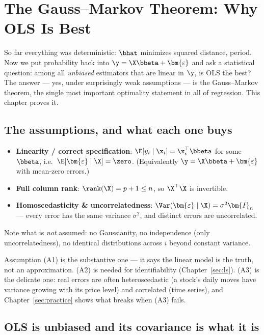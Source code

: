 \section{The Gauss--Markov Theorem: Why OLS Is Best}\label{sec:gauss-markov}

So far everything was deterministic: $\bhat$ minimizes squared distance, period. Now we put probability back into $\y = \X\bbeta + \bm{\varepsilon}$ and ask a statistical question: among all \emph{unbiased} estimators that are linear in $\y$, is OLS the best? The answer — yes, under surprisingly weak assumptions — is the Gauss--Markov theorem, the single most important optimality statement in all of regression. This chapter proves it.

\subsection{The assumptions, and what each one buys}

\begin{keybox}
\begin{itemize}
  \item[\textbf{(A1)}] \textbf{Linearity / correct specification}: $\E[y_i \mid \x_i] = \x_i^\top \bbeta$ for some $\bbeta$, i.e.\ $\E[\bm{\varepsilon} \mid \X] = \zero$. (Equivalently $\y = \X\bbeta + \bm{\varepsilon}$ with mean-zero errors.)
  \item[\textbf{(A2)}] \textbf{Full column rank}: $\rank(\X) = p+1 \le n$, so $\X^\top\X$ is invertible.
  \item[\textbf{(A3)}] \textbf{Homoscedasticity \& uncorrelatedness}: $\Var(\bm{\varepsilon} \mid \X) = \sigma^2 \bm{I}_n$ — every error has the same variance $\sigma^2$, and distinct errors are uncorrelated.
\end{itemize}
Note what is \emph{not} assumed: no Gaussianity, no independence (only uncorrelatedness), no identical distributions across $i$ beyond constant variance.
\end{keybox}

Assumption (A1) is the substantive one — it says the linear model is the truth, not an approximation. (A2) is needed for identifiability (Chapter~\ref{sec:ls}). (A3) is the delicate one: real errors are often heteroscedastic (a stock's daily moves have variance growing with its price level) and correlated (time series), and Chapter~\ref{sec:practice} shows what breaks when (A3) fails.

\subsection{OLS is unbiased and its covariance is what it is}

